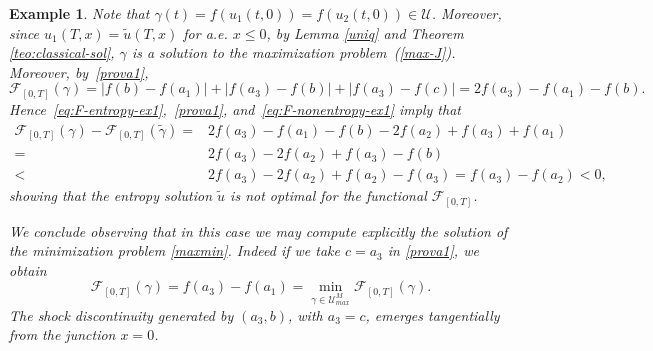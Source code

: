 \documentclass[a4paper, 10pt, final]{article}
\newtheorem{example}{Example}[section]
\newcommand{\abs}[1]{\left|#1\right|}
\begin{document}
\begin{example}
  Note that $\gamma(t)=f(u_1(t, 0))=f(u_2(t, 0))\in \mathcal{U}$. Moreover, since $u_1(T,x)=\widetilde u(T,x)$ for a.e. $x\leq 0$,  by Lemma \ref{uniq} and Theorem \ref{teo:classical-sol}, $\gamma$  is a solution 
  to the maximization problem~(\ref{max-J}). Moreover, by~\eqref{prova1},
  \begin{equation}
    \label{eq:F-nonentropy-ex1}
    \mathcal{F}_{[0,T]} (\gamma) = \abs{f(b) - f(a_1)} + \abs{f(a_3) - f(b)} + \abs{f(a_3) - f(c)}
    =  2f(a_3)-f(a_1) -f(b).
  \end{equation}
  Hence~\eqref{eq:F-entropy-ex1},~\eqref{prova1}, and~\eqref{eq:F-nonentropy-ex1} imply that
  \begin{align*}
    \mathcal{F}_{[0,T]} (\gamma)
    -\mathcal{F}_{[0,T]} (\widetilde \gamma) =
    &   2f(a_3)-f(a_1)-f(b)-2f(a_2)+f(a_3)+f(a_1)
    \\
    = & 2f(a_3)-2f(a_2)+f(a_3)-f(b)
    \\
    < & 2f(a_3)-2f(a_2) + f(a_2) - f(a_3)=f(a_3) - f(a_2) <0, 
  \end{align*}
  showing that the entropy solution $\widetilde{u}$ is not optimal for the functional
  $\mathcal F_{[0,T]}$.

We conclude observing that  in this case we may compute explicitly  the solution of the minimization problem \eqref{maxmin}. Indeed if we take $c=a_3$ in \eqref{prova1}, we obtain \[\mathcal{F}_{[0,T]} (\gamma)=f(a_3)-f(a_1)=\min_{\gamma\in\mathcal{U}_{max}^M} \mathcal{F}_{[0,T]} (\gamma).\]  
The shock discontinuity generated by $(a_3,b)$, with $a_3=c$, emerges tangentially from
the junction $x = 0$.
 
  \begin{figure}
    \centering
\end{figure}
\end{example}
\end{document}
